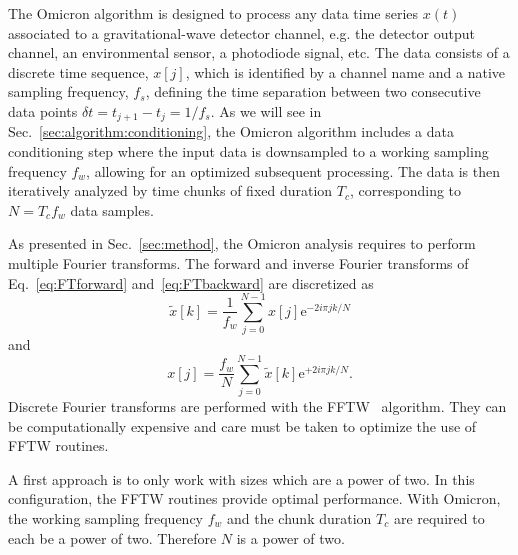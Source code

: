 The Omicron algorithm is designed to process any data time series $x(t)$ associated to a gravitational-wave detector channel, e.g. the detector output channel, an environmental sensor, a photodiode signal, etc. The data consists of a discrete time sequence, $x[j]$, which is identified by a channel name and a native sampling frequency, $f_s$, defining the time separation between two consecutive data points $\delta t = t_{j+1}-t_j = 1/f_s$. As we will see in Sec.~\ref{sec:algorithm:conditioning}, the Omicron algorithm includes a data conditioning step where the input data is downsampled to a working sampling frequency $f_w$, allowing for an optimized subsequent processing. The data is then iteratively analyzed by time chunks of fixed duration $T_c$, corresponding to $N=T_cf_w$ data samples.


As presented in Sec.~\ref{sec:method}, the Omicron analysis requires to perform multiple Fourier transforms. The forward and inverse Fourier transforms of Eq.~\ref{eq:FTforward} and~\ref{eq:FTbackward} are discretized as 
\begin{equation}
  \tilde{x}[k]=\frac{1}{f_w}\sum_{j=0}^{N-1}{x[j]\mathrm{e}^{-2i\pi jk/N}}
\end{equation}
and
\begin{equation}
  x[j]=\frac{f_w}{N}\sum_{j=0}^{N-1}{\tilde{x}[k]\mathrm{e}^{+2i\pi jk/N}}.
\end{equation}
Discrete Fourier transforms are performed with the FFTW~\cite{FFTW} algorithm. They can be computationally expensive and care must be taken to optimize the use of FFTW routines.

A first approach is to only work with sizes which are a power of two. In this configuration, the FFTW routines provide optimal performance. With Omicron, the working sampling frequency $f_w$ and the chunk duration $T_c$ are required to each be a power of two. Therefore $N$ is a power of two.

